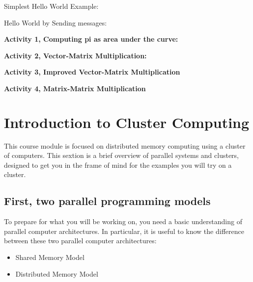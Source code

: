 \documentclass[letterpaper,10pt,openany,oneside]{sphinxmanual}
\begin{document}
Simplest Hello World Example:

Hello World by Sending messages:

\textbf{Activity 1, Computing pi as area under the curve:}



\textbf{Activity 2, Vector-Matrix Multiplication:}



\textbf{Activity 3, Improved Vector-Matrix Multiplication}



\textbf{Activity 4, Matrix-Matrix Multiplication}




\chapter{Introduction to Cluster Computing}
\label{IntroCluster/IntroCluster:introduction-to-cluster-computing}\label{IntroCluster/IntroCluster::doc}
This course module is focused on distributed memory computing using a cluster of computers.
This sextion is a brief overview of parallel systems and clusters, designed to get you in the frame of mind for the examples you will try on a cluster.


\section{First, two parallel programming models}
\label{IntroCluster/IntroCluster:first-two-parallel-programming-models}
To prepare for what you will be working on, you need a basic understanding of parallel computer architectures. In particular, it is useful to know the difference between these two parallel computer architectures:
\begin{itemize}
\item {} 
Shared Memory Model

\item {} 
Distributed Memory Model

\end{itemize}
\end{document}
